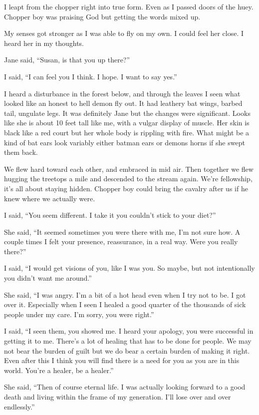 I leapt from the chopper right into true form. Even as I passed doors of the huey. Chopper boy was praising God but getting the words mixed up.

My senses got stronger as I was able to fly on my own. I could feel her close. I heard her in my thoughts.

Jane said, ``Susan, is that you up there?''

I said, ``I can feel you I think. I hope. I want to say yes.''

I heard a disturbance in the forest below, and through the leaves I seen what looked like an honest to hell demon fly out. It had leathery bat wings, barbed tail, ungulate legs. It was definitely Jane but the changes were significant. Looks like she is about 10 feet tall like me, with a vulgar display of muscle. Her skin is black like a red court but her whole body is rippling with fire. What might be a kind of bat ears look variably either batman ears or demons horns if she swept them back.

We flew hard toward each other, and embraced in mid air. Then together we flew hugging the treetops a mile and descended to the stream again. We're fellowship, it's all about staying hidden. Chopper boy could bring the cavalry after us if he knew where we actually were.

I said, ``You seem different. I take it you couldn't stick to your diet?''

She said, ``It seemed sometimes you were there with me, I'm not sure how. A couple times I felt your presence, reassurance, in a real way. Were you really there?''

I said, ``I would get visions of you, like I was you. So maybe, but not intentionally you didn't want me around.''

She said, ``I was angry. I'm a bit of a hot head even when I try not to be. I got over it. Especially when I seen I healed a good quarter of the thousands of sick people under my care. I'm sorry, you were right.''

I said, ``I seen them, you showed me. I heard your apology, you were successful in getting it to me. There's a lot of healing that has to be done for people. We may not bear the burden of guilt but we do bear a certain burden of making it right. Even after this I think you will find there is a need for you as you are in this world. You're a healer, be a healer.''

She said, ``Then of course eternal life. I was actually looking forward to a good death and living within the frame of my generation. I'll lose over and over endlessly.''

